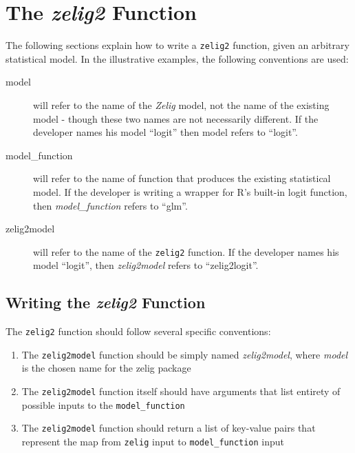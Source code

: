 \section{The \emph{zelig2} Function}
The following sections explain how to write a {\tt zelig2} function, given an arbitrary
statistical model.  In the illustrative examples, the following conventions are used:



\begin{description}

	\item[model] will refer to the name of the \emph{Zelig} model, not the name of the
		existing model - though these two names are not necessarily different.  If the developer
		names his model ``logit'' then model refers to ``logit''.

	\item[model\_function] will refer to the name of function that produces the existing
		statistical model.  If the developer is writing a wrapper for R's built-in logit function,
		then \emph{model\_function} refers to ``glm''.
		
	\item[zelig2model] will refer to the name of the {\tt zelig2} function.  If the developer
		names his model ``logit'', then \emph{zelig2model} refers to ``zelig2logit''.
		
\end{description}


\subsection{Writing the \emph{zelig2} Function}

The {\tt zelig2} function should follow several specific conventions:

\begin{enumerate}

	\item The {\tt zelig2model} function should be simply named \emph{zelig2model}, where
		\emph{model} is the chosen name for the zelig package

	\item The {\tt zelig2model} function itself should have arguments that list entirety of
		possible inputs to the {\tt model\_function}

	\item The {\tt zelig2model} function should return a list of key-value pairs that represent
		the map from {\tt zelig} input to {\tt model\_function} input

\end{enumerate}


